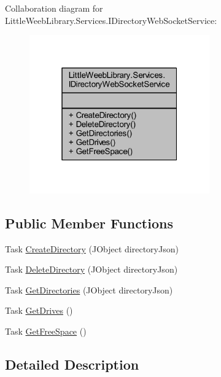 Collaboration diagram for Little\+Weeb\+Library.\+Services.\+I\+Directory\+Web\+Socket\+Service\+:\nopagebreak
\begin{figure}[H]
\begin{center}
\leavevmode
\includegraphics[width=220pt]{interface_little_weeb_library_1_1_services_1_1_i_directory_web_socket_service__coll__graph}
\end{center}
\end{figure}
\subsection*{Public Member Functions}
\begin{DoxyCompactItemize}
\item 
Task \mbox{\hyperlink{interface_little_weeb_library_1_1_services_1_1_i_directory_web_socket_service_a8c80286719a0fb39034e2ba88e244bbe}{Create\+Directory}} (J\+Object directory\+Json)
\item 
Task \mbox{\hyperlink{interface_little_weeb_library_1_1_services_1_1_i_directory_web_socket_service_a7247bbfce026cc39dc8721536c8ba6a8}{Delete\+Directory}} (J\+Object directory\+Json)
\item 
Task \mbox{\hyperlink{interface_little_weeb_library_1_1_services_1_1_i_directory_web_socket_service_a6062c7a41f8cbbe4b78295e4073c5225}{Get\+Directories}} (J\+Object directory\+Json)
\item 
Task \mbox{\hyperlink{interface_little_weeb_library_1_1_services_1_1_i_directory_web_socket_service_a079ed5bda7dd1c9fa497bf3a1effacaa}{Get\+Drives}} ()
\item 
Task \mbox{\hyperlink{interface_little_weeb_library_1_1_services_1_1_i_directory_web_socket_service_a0a28e43d70bf2d5904bb4e59d1cd6cd7}{Get\+Free\+Space}} ()
\end{DoxyCompactItemize}


\subsection{Detailed Description}


